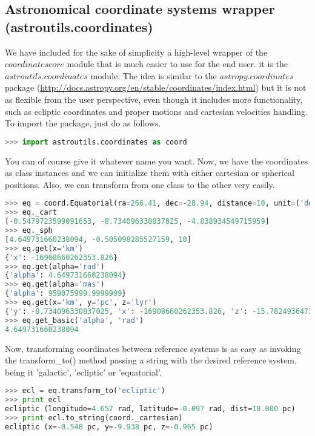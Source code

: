 \documentclass[
a4paper, %
11pt, %
onecolumn, %
openany, %
]{memoir}
\begin{document}
\subsection{Astronomical coordinate systems wrapper (astroutils.coordinates)}
We have included for the sake of simplicity a high-level wrapper of the $coordinatescore$ module that is much easier to use for the end user. it is the
$astroutils.coordinates$ module. The idea is similar to the $astropy.coordinates$ package (\href{http://docs.astropy.org/en/stable/coordinates/index.html}{http://docs.astropy.org/en/stable/coordinates/index.html})
but it is not as flexible from the user perspective, even though it includes more functionality, such as ecliptic coordinates and proper motions and cartesian
velocities handling. To import the package, just do as follows.

\begin{lstlisting}[language=Python]
>>> import astroutils.coordinates as coord
\end{lstlisting}

You can of course give it whatever name you want. Now, we have the coordinates as class instances and we can initialize them with either cartesian or spherical positions. Also, we can transform
from one class to the other very easily.

\begin{lstlisting}[language=Python]
>>> eq = coord.Equatorial(ra=266.41, dec=-28.94, distance=10, unit=('deg', 'deg', 'pc'))
>>> eq._cart
[-0.5479723599091653, -8.734096330837025, -4.838934549715959]
>>> eq._sph
[4.649731660238094, -0.505098285527159, 10]
>>> eq.get(x='km')
{'x': -16908660262353.826}
>>> eq.get(alpha='rad')
{'alpha': 4.649731660238094}
>>> eq.get(alpha='mas')
{'alpha': 959075999.9999999}
>>> eq.get(x='km', y='pc', z='lyr')
{'y': -8.734096330837025, 'x': -16908660262353.826, 'z': -15.782493647313924}
>>> eq.get_basic('alpha', 'rad')
4.649731660238094
\end{lstlisting}

Now, transforming coordinates between reference systems is as easy as
invoking the transform\_to() method passing a string with the desired
reference system, being it 'galactic', 'ecliptic' or 'equatorial'.

\begin{lstlisting}[language=Python]
>>> ecl = eq.transform_to('ecliptic')
>>> print ecl
ecliptic (longitude=4.657 rad, latitude=-0.097 rad, dist=10.000 pc)
>>> print ecl.to_string(coord._cartesian)
ecliptic (x=-0.548 pc, y=-9.938 pc, z=-0.965 pc)
\end{lstlisting}
\end{document}
